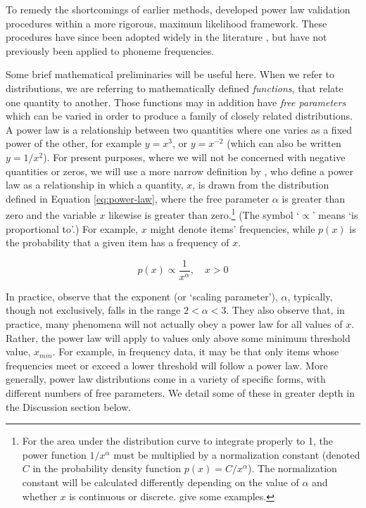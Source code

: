 To remedy the shortcomings of earlier methods, \textcite{clauset_power-law_2009} developed power law validation procedures within a more rigorous, maximum likelihood framework. These procedures have since been adopted widely in the literature \autocites[for example,][]{touboul_can_2010}{cho_friendship_2011}{brzezinski_power_2014}[and][]{lee_change_2018}, but have not previously been applied to phoneme frequencies.

Some brief mathematical preliminaries will be useful here. When we refer to distributions, we are referring to mathematically defined \emph{functions}, that relate one quantity to another. Those functions may in addition have \emph{free parameters} which can be varied in order to produce a family of closely related distributions. A power law is a relationship between two quantities where one varies as a fixed power of the other, for example \(y = x^3\), or \(y = x^{-2}\) (which can also be written \(y = 1/x^2\)). For present purposes, where we will not be concerned with negative quantities or zeros, we will use a more narrow definition by \textcite[p.~662]{clauset_power-law_2009}, who define a power law as a relationship in which a quantity, \(x\), is drawn from the distribution defined in Equation \eqref{eq:power-law}, where the free parameter \(\alpha\) is greater than zero and the variable \(x\) likewise is greater than zero.\footnote{For the area under the distribution curve to integrate properly to 1, the power function \(1/x^{\alpha}\) must be multiplied by a normalization constant (denoted \(C\) in the probability density function \(p(x) = C/x^{\alpha}\)). The normalization constant will be calculated differently depending on the value of \(\alpha\) and whether \(x\) is continuous or discrete. \textcite[p.~664]{clauset_power-law_2009} give some examples.} (The symbol `\(\propto\)' means `is proportional to'.) For example, \(x\) might denote items' frequencies, while \(p(x)\) is the probability that a given item has a frequency of \(x\).

\begin{equation}
p(x) \propto \frac{1}{x^{\alpha}},\quad x > 0
\label{eq:power-law}
\end{equation}

In practice, \textcite[p.~662]{clauset_power-law_2009} observe that the exponent (or `scaling parameter'), \(\alpha\), typically, though not exclusively, falls in the range \(2 < \alpha < 3\). They also observe that, in practice, many phenomena will not actually obey a power law for all values of \(x\). Rather, the power law will apply to values only above some minimum threshold value, \(x_{min}\). For example, in frequency data, it may be that only items whose frequencies meet or exceed a lower threshold will follow a power law. More generally, power law distributions come in a variety of specific forms, with different numbers of free parameters. We detail some of these in greater depth in the Discussion section below.


